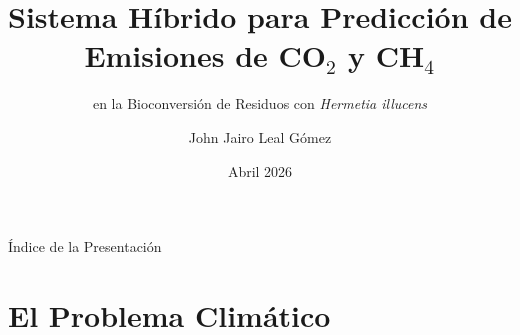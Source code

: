 \documentclass[aspectratio=169, 11pt]{beamer}
\title[Sistema Híbrido BSF]{Sistema Híbrido para Predicción de Emisiones de CO$_2$ y CH$_4$}
\subtitle{en la Bioconversión de Residuos con \textit{Hermetia illucens}}
\author{John Jairo Leal Gómez}
\institute[UNAL]{Doctorado en Estudios Ambientales\\Universidad Nacional de Colombia -- Sede Palmira}
\date{Abril 2026}
\begin{document}
\begin{frame}[plain]
    \titlepage
\end{frame}

\begin{frame}{Índice de la Presentación}
    \tableofcontents
\end{frame}

\section{El Problema Climático}
\end{document}
